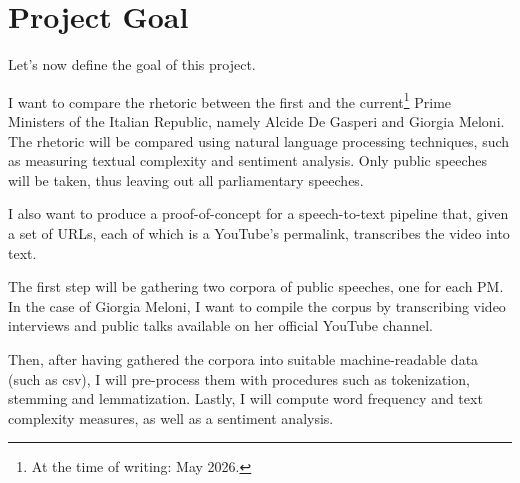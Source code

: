 \section{Project Goal}

Let's now define the goal of this project.

I want to compare the rhetoric between the first and the current\footnote{At the time of writing: May 2026.} Prime Ministers of the Italian Republic, namely Alcide De Gasperi and Giorgia Meloni. 
The rhetoric will be compared using natural language processing techniques, such as measuring textual complexity and sentiment analysis. Only public speeches will be taken, thus leaving out all parliamentary speeches.

I also want to produce a proof-of-concept for a speech-to-text pipeline that, given a set of URLs, each of which is a YouTube's permalink, transcribes the video into text. 

The first step will be gathering two corpora of public speeches, one for each PM. In the case of Giorgia Meloni, I want to compile the corpus by transcribing video interviews and public talks available on her official YouTube channel.

Then, after having gathered the corpora into suitable machine-readable data (such as csv), I will pre-process them with procedures such as tokenization, stemming and lemmatization. Lastly, I will compute word frequency and text complexity measures, as well as a sentiment analysis.

